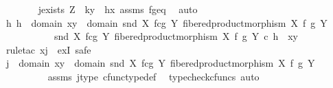 \begin{isabellebody}
\ \ \ \ \ \ \isamarkupfalse%
\ j{\isacharunderscore}{\kern0pt}exists{\isacharbrackleft}{\kern0pt}\ Z{\isacharequal}{\kern0pt}{\isasymone}{\isacharcomma}{\kern0pt}\ \ k{\isacharequal}{\kern0pt}y{\isacharcomma}{\kern0pt}\ \ h{\isacharequal}{\kern0pt}x{\isacharbrackright}{\kern0pt}\ assms\ f{\isacharunderscore}{\kern0pt}g{\isacharunderscore}{\kern0pt}eq\ \isamarkupfalse%
\ auto\isanewline
\ \ \ \ \isamarkupfalse%
\ {\isachardoublequoteopen}{\isasymexists}h{\isachardot}{\kern0pt}\ h\ {\isacharcolon}{\kern0pt}\ domain\ {\isasymlangle}x{\isacharcomma}{\kern0pt}y{\isasymrangle}\ {\isasymrightarrow}\ domain\ {\isacharparenleft}{\kern0pt}snd\ {\isacharparenleft}{\kern0pt}X\ \isactrlbsub f\isactrlesub {\isasymtimes}\isactrlsub c\isactrlbsub g\isactrlesub \ Y{\isacharcomma}{\kern0pt}\ fibered{\isacharunderscore}{\kern0pt}product{\isacharunderscore}{\kern0pt}morphism\ X\ f\ g\ Y{\isacharparenright}{\kern0pt}{\isacharparenright}{\kern0pt}\ {\isasymand}\isanewline
\ \ \ \ \ \ \ \ \ \ \ snd\ {\isacharparenleft}{\kern0pt}X\ \isactrlbsub f\isactrlesub {\isasymtimes}\isactrlsub c\isactrlbsub g\isactrlesub \ Y{\isacharcomma}{\kern0pt}\ fibered{\isacharunderscore}{\kern0pt}product{\isacharunderscore}{\kern0pt}morphism\ X\ f\ g\ Y{\isacharparenright}{\kern0pt}\ {\isasymcirc}\isactrlsub c\ h\ {\isacharequal}{\kern0pt}\ {\isasymlangle}x{\isacharcomma}{\kern0pt}y{\isasymrangle}{\isachardoublequoteclose}\isanewline
\ \ \ \ \isamarkupfalse%
\ {\isacharparenleft}{\kern0pt}rule{\isacharunderscore}{\kern0pt}tac\ x{\isacharequal}{\kern0pt}j\ \ exI{\isacharcomma}{\kern0pt}\ safe{\isacharparenright}{\kern0pt}\isanewline
\ \ \ \ \ \ \isamarkupfalse%
\ {\isachardoublequoteopen}j\ {\isacharcolon}{\kern0pt}\ domain\ {\isasymlangle}x{\isacharcomma}{\kern0pt}y{\isasymrangle}\ {\isasymrightarrow}\ domain\ {\isacharparenleft}{\kern0pt}snd\ {\isacharparenleft}{\kern0pt}X\ \isactrlbsub f\isactrlesub {\isasymtimes}\isactrlsub c\isactrlbsub g\isactrlesub \ Y{\isacharcomma}{\kern0pt}\ fibered{\isacharunderscore}{\kern0pt}product{\isacharunderscore}{\kern0pt}morphism\ X\ f\ g\ Y{\isacharparenright}{\kern0pt}{\isacharparenright}{\kern0pt}{\isachardoublequoteclose}\isanewline
\ \ \ \ \ \ \ \ \isamarkupfalse%
\ assms\ j{\isacharunderscore}{\kern0pt}type\ cfunc{\isacharunderscore}{\kern0pt}type{\isacharunderscore}{\kern0pt}def\ \isamarkupfalse%
\ {\isacharparenleft}{\kern0pt}typecheck{\isacharunderscore}{\kern0pt}cfuncs{\isacharcomma}{\kern0pt}\ auto{\isacharparenright}{\kern0pt}\isanewline

\end{isabellebody}
